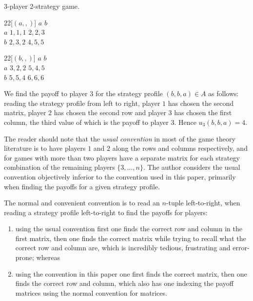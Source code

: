 	\begin{example} \label{fullsymeg} 3-player 2-strategy game.
		\begin{center}
  		\begin{game}{2}{2}[$(a,,)$]
    			     \>  $a$      \>  $b$      \\
    			$a$  \>  $1,1,1$  \>  $2,2,3$  \\
    			$b$  \>  $2,3,2$  \>  $4,5,5$  
  		\end{game}
  		\hspace*{5mm}
  		\begin{game}{2}{2}[$(b,,)$]
       			 \>  $a$      \>  $b$      \\
    			$a$  \>  $3,2,2$  \>  $5,4,5$  \\
    			$b$  \>  $5,5,4$  \>  $6,6,6$ 
  		\end{game}
		\end{center}
		We find the payoff to player $3$ for the strategy profile $(b, b, a) \in A$ as follows: reading the strategy profile from left to right, player $1$ has chosen the second matrix, player $2$ has chosen the second row and player $3$ has chosen the first column, the third value of which is the payoff to player $3$. Hence $u_3(b,b,a) = 4$.
	\end{example}
	
	The reader should note that the \textit{usual convention} in most of the game theory literature is to have players $1$ and $2$ along the rows and columns respectively, and for games with more than two players have a separate matrix for each strategy combination of the remaining players $\{3, \ldots, n\}$. The author considers the usual convention objectively inferior to the convention used in this paper, primarily when finding the payoffs for a given strategy profile. 
		
	The normal and convenient convention is to read an $n$-tuple left-to-right, when reading a strategy profile left-to-right to find the payoffs for players:
	\begin{enumerate}
		\item using the usual convention first one finds the correct row and column in the first matrix, then one finds the correct matrix while trying to recall what the correct row and column are, which is incredibly tedious, frustrating and error-prone; whereas
		\item using the convention in this paper one first finds the correct matrix, then one finds the correct row and column, which also has one indexing the payoff matrices using the normal convention for matrices. 
	\end{enumerate} 
	

